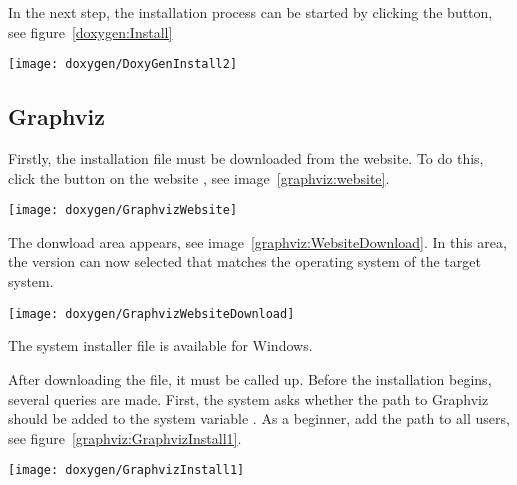 In the next step, the installation process can be started by clicking the  button, see figure~\ref{doxygen:Install}

\begin{center}
    \texttt{[image: doxygen/DoxyGenInstall2]}
    \label{doxygen:Install}
\end{center} 



\subsection{Graphviz}

   
Firstly, the installation file must be downloaded from the website. To do this, click the  button   on the website , see image~\ref{graphviz:website}.
    
    \begin{center}
        \texttt{[image: doxygen/GraphvizWebsite]}
        \label{graphviz:website}
    \end{center} 
    
The donwload area appears, see image~\ref{graphviz:WebsiteDownload}. In this area, the version can now selected that matches the operating system of the target system.
    
    
    \begin{center}
        \texttt{[image: doxygen/GraphvizWebsiteDownload]}
        \label{graphviz:WebsiteDownload}
    \end{center} 
    


The system installer file   is available for Windows. 
    
 After downloading the file, it must be called up. Before the installation begins, several queries are made. First, the system asks whether the path to Graphviz should be added to the system variable . As a beginner, add the path to all users,  see figure~\ref{graphviz:GraphvizInstall1}.
    
    \begin{center}
        \texttt{[image: doxygen/GraphvizInstall1]}
        \label{graphviz:GraphvizInstall1}
    \end{center} 
    
